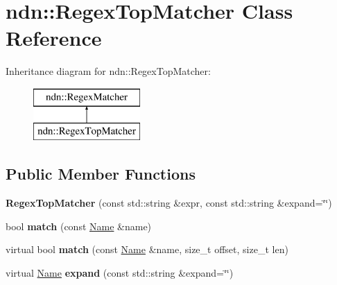 \hypertarget{classndn_1_1RegexTopMatcher}{}\section{ndn\+:\+:Regex\+Top\+Matcher Class Reference}
\label{classndn_1_1RegexTopMatcher}
Inheritance diagram for ndn\+:\+:Regex\+Top\+Matcher\+:\begin{figure}[H]
\begin{center}
\leavevmode
\includegraphics[height=2.000000cm]{classndn_1_1RegexTopMatcher}
\end{center}
\end{figure}
\subsection*{Public Member Functions}
\begin{DoxyCompactItemize}
\item 
{\bfseries Regex\+Top\+Matcher} (const std\+::string \&expr, const std\+::string \&expand=\char`\"{}\char`\"{})\hypertarget{classndn_1_1RegexTopMatcher_ab92c64fcc7b324d4e86628e8f799eca4}{}\label{classndn_1_1RegexTopMatcher_ab92c64fcc7b324d4e86628e8f799eca4}

\item 
bool {\bfseries match} (const \hyperlink{classndn_1_1Name}{Name} \&name)\hypertarget{classndn_1_1RegexTopMatcher_a5fbdd5c88f047639c9463fe6cf319d6d}{}\label{classndn_1_1RegexTopMatcher_a5fbdd5c88f047639c9463fe6cf319d6d}

\item 
virtual bool {\bfseries match} (const \hyperlink{classndn_1_1Name}{Name} \&name, size\+\_\+t offset, size\+\_\+t len)\hypertarget{classndn_1_1RegexTopMatcher_aa11e44b83f0e46f6d8b19dc151b04d1f}{}\label{classndn_1_1RegexTopMatcher_aa11e44b83f0e46f6d8b19dc151b04d1f}

\item 
virtual \hyperlink{classndn_1_1Name}{Name} {\bfseries expand} (const std\+::string \&expand=\char`\"{}\char`\"{})\hypertarget{classndn_1_1RegexTopMatcher_a9f5d7069c24c2272626f7c668a607833}{}\label{classndn_1_1RegexTopMatcher_a9f5d7069c24c2272626f7c668a607833}

\end{DoxyCompactItemize}
